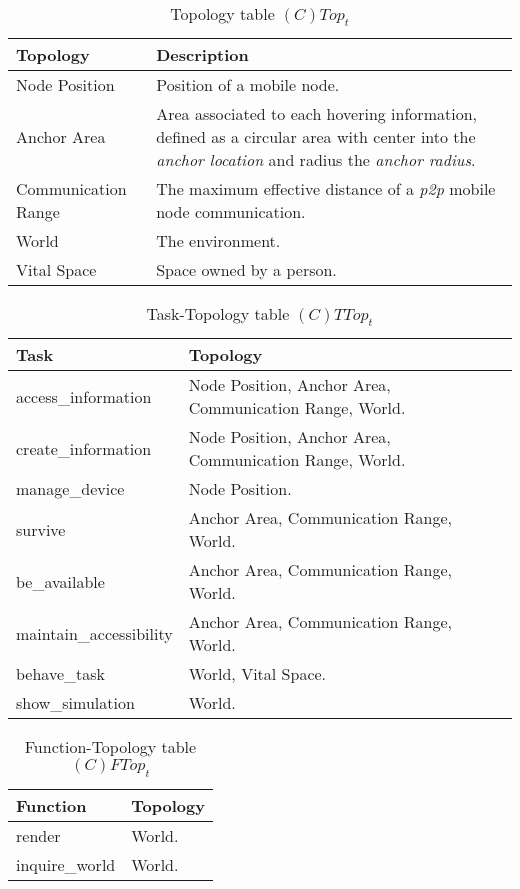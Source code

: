 \begin{table}[H]
	\centering
	\begin{tabular}{|p{4cm}|p{8cm}|}
			\hline
			\textbf{Topology} & \textbf{Description} \\
			\hline
			Node Position & Position of a mobile node. \\
			\hline
			Anchor Area & Area associated to each hovering information, defined as a
			circular area with center into the \emph{anchor location} and radius the
			\emph{anchor radius}.\\
			\hline
			Communication Range & The maximum effective distance of a \emph{p2p}
			mobile node communication. \\
			\hline
			World & The environment. \\
			\hline
			Vital Space & Space owned by a person. \\
			\hline
		\end{tabular}
	\caption{Topology table $(C)Top_t$}
	\label{tab:ctopt}
\end{table}

\begin{table}[H]
	\centering
	\begin{tabular}{|p{4cm}|p{8cm}|}
			\hline
			\textbf{Task} & \textbf{Topology} \\
			\hline
			access\_information& Node Position, Anchor Area, Communication Range, World.\\
			\hline
			create\_information & Node Position, Anchor Area, Communication Range, World.\\
			\hline
			manage\_device & Node Position. \\	
			\hline
			survive & Anchor Area, Communication Range, World. \\
			\hline
			be\_available & Anchor Area, Communication Range, World. \\
			\hline
			maintain\_accessibility & Anchor Area, Communication Range, World. \\
			\hline
			behave\_task & World, Vital Space. \\
			\hline
			show\_simulation & World. \\
			\hline
		\end{tabular}
		\caption{Task-Topology table $(C)TTop_t$}
	\label{tab:cttopt}
\end{table}

\begin{table}[H]
	\centering
	\begin{tabular}{|p{4cm}|p{8cm}|}
			\hline
			\textbf{Function} & \textbf{Topology} \\
			\hline
			render & World.\\
			\hline
			inquire\_world & World.\\
			\hline
		\end{tabular}
	\caption{Function-Topology table $(C)FTop_t$}
	\label{tab:cftopt}
\end{table}


